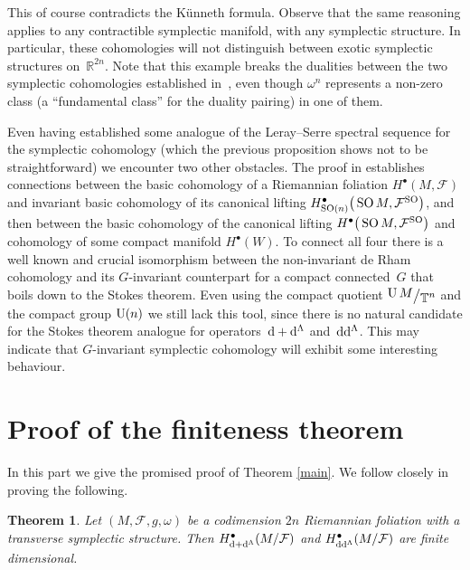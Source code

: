 \documentclass[10pt,a4paper]{amsart}
\numberwithin{equation}{section}
\newtheorem{Theorem}{Theorem}[section]
{ \theoremstyle{definition}
\newtheorem{Definition}[Theorem]{Definition}
\newtheorem{Example}[Theorem]{Example}
\newtheorem{Remark}[Theorem]{Remark} }
\newcommand{\bigslant}[2]{{\raisebox{.2em}{$#1$}\big/\raisebox{-.2em}{$#2$}}}
\begin{document}
This of course contradicts the K\"unneth formula. Observe that the same reasoning applies to any contractible symplectic manifold, with any symplectic structure. In particular, these cohomologies will not distinguish between exotic symplectic structures on~$\mathbb{R}^{2n}$. Note that this example breaks the dualities between the two symplectic cohomologies established in~\cite{tseng}, even though $\omega^n$ represents a non-zero class (a ``fundamental class'' for the duality pairing) in one of them.
\begin{Remark}
Even having established some analogue of the Leray--Serre spectral sequence for the symplectic cohomology (which the previous proposition shows not to be straightforward) we encounter two other obstacles. The proof in \cite{aziztopologiczny} establishes connections between the basic cohomology of a Riemannian foliation $H^{\bullet}(M,\mathcal{F})$ and invariant basic cohomology of its canonical lifting $H^{\bullet}_{{\rm SO}(n)}\big(\operatorname{SO} M,\mathcal{F}^{{\rm SO}}\big)$, and then between the basic cohomology of the canonical lifting $H^{\bullet}\big(\operatorname{SO} M,\mathcal{F}^{{\rm SO}}\big)$ and cohomology of some compact manifold $H^{\bullet}(W)$. To connect all four there is a well known and crucial isomorphism between the non-invariant de Rham cohomology and its $G$-invariant counterpart for a compact connected~$G$ that boils down to the Stokes theorem. Even using the compact quotient $\bigslant{\operatorname{U} M}{\mathbb{T}^n}$ and the compact group ${\rm U}(n)$ we still lack this tool, since there is no natural candidate for the Stokes theorem analogue for operators~${\rm d}+{\rm d}^{\Lambda}$ and~${\rm d}{\rm d}^{\Lambda}$. This may indicate that $G$-invariant symplectic cohomology will exhibit some interesting behaviour.
\end{Remark}

\section{Proof of the finiteness theorem} \label{wreszciedowod}

In this part we give the promised proof of Theorem \ref{main}. We follow closely \cite{tseng} in proving the following.

\begin{Theorem}
Let $(M,\mathcal{F},g,\omega)$ be a codimension $2n$ Riemannian foliation with a transverse symplectic structure. Then $H^{\bullet}_{{\rm d}+{\rm d}^{\Lambda}}(M\slash\mathcal{F})$ and $H^{\bullet}_{{\rm d}{\rm d}^{\Lambda}}(M\slash\mathcal{F})$ are finite dimensional.
\end{Theorem}
\end{document}

